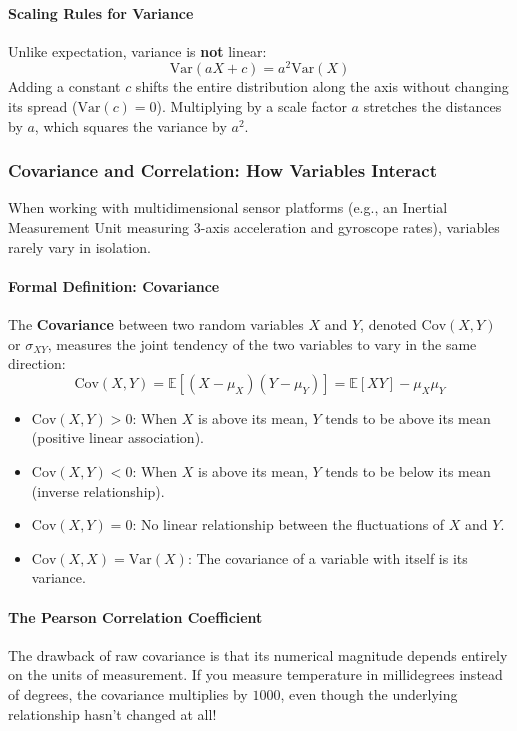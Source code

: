 \paragraph{Scaling Rules for Variance}
Unlike expectation, variance is \textbf{not} linear:
\begin{equation}
\text{Var}(aX + c) = a^2 \text{Var}(X)\label{eq:variance_scaling}
\end{equation}
Adding a constant $c$ shifts the entire distribution along the axis without changing its spread ($\text{Var}(c) = 0$). Multiplying by a scale factor $a$ stretches the distances by $a$, which squares the variance by $a^2$.

\subsubsection{Covariance and Correlation: How Variables Interact}
When working with multidimensional sensor platforms (e.g., an Inertial Measurement Unit measuring 3-axis acceleration and gyroscope rates), variables rarely vary in isolation.

\paragraph{Formal Definition: Covariance}

The \textbf{Covariance} between two random variables $X$ and $Y$, denoted $\text{Cov}(X, Y)$ or $\sigma_{XY}$, measures the joint tendency of the two variables to vary in the same direction:
\begin{equation}
\text{Cov}(X, Y) = \mathbb{E}\left[(X - \mu_X)(Y - \mu_Y)\right] = \mathbb{E}[XY] - \mu_X \mu_Y\label{eq:covariance_def}
\end{equation}
\begin{itemize}
    \item $\text{Cov}(X, Y) > 0$: When $X$ is above its mean, $Y$ tends to be above its mean (positive linear association).
    \item $\text{Cov}(X, Y) < 0$: When $X$ is above its mean, $Y$ tends to be below its mean (inverse relationship).
    \item $\text{Cov}(X, Y) = 0$: No linear relationship between the fluctuations of $X$ and $Y$.
    \item $\text{Cov}(X, X) = \text{Var}(X)$: The covariance of a variable with itself is its variance.
\end{itemize}


\paragraph{The Pearson Correlation Coefficient}
The drawback of raw covariance is that its numerical magnitude depends entirely on the units of measurement. If you measure temperature in millidegrees instead of degrees, the covariance multiplies by $1000$, even though the underlying relationship hasn't changed at all!

